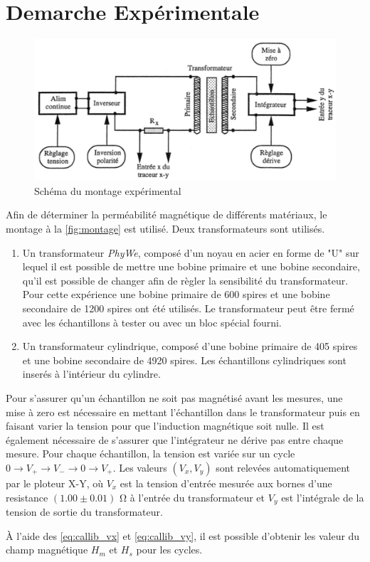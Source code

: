 \section{Demarche Expérimentale}

\begin{figure}[h]
    \centering
    \includegraphics[width=0.8\linewidth]{figures/montage.png}
    \caption{Schéma du montage expérimental \cite{notice}}
    \label{fig:montage}
\end{figure}

Afin de déterminer la perméabilité magnétique de différents matériaux, le montage à la \autoref{fig:montage} est utilisé. Deux transformateurs sont utilisés.

\begin{enumerate}
    \item Un transformateur \textit{PhyWe}, composé d'un noyau en acier en forme de "U" sur lequel il est possible de mettre une bobine primaire et une bobine secondaire, qu'il est possible de changer afin de règler la sensibilité du transformateur. Pour cette expérience une bobine primaire de 600 spires et une bobine secondaire de 1200 spires ont été utilisés. Le transformateur peut être fermé avec les échantillons à tester ou avec un bloc spécial fourni.
    \item Un transformateur cylindrique, composé d'une bobine primaire de 405 spires et une bobine secondaire de 4920 spires. Les échantillons cylindriques sont inserés à l'intérieur du cylindre.
\end{enumerate}

Pour s'assurer qu'un échantillon ne soit pas magnétisé avant les mesures, une mise à zero est nécessaire en mettant l'échantillon dans le transformateur puis en faisant varier la tension pour que l'induction magnétique soit nulle. Il est également nécessaire de s'assurer que l'intégrateur ne dérive pas entre chaque mesure. Pour chaque échantillon, la tension est variée sur un cycle \(0 \rightarrow V_+ \rightarrow V_- \rightarrow 0 \rightarrow V_+\). Les valeurs \((V_x, V_y)\) sont relevées automatiquement par le ploteur X-Y, où \(V_x\) est la tension d'entrée mesurée aux bornes d'une resistance \((1.00 \pm 0.01)\) \si{\ohm} à l'entrée du transformateur et \(V_y\) est l'intégrale de la tension de sortie du transformateur.

À l'aide des \autoref{eq:callib_vx} et \autoref{eq:callib_vy}, il est possible d'obtenir les valeur du champ magnétique \(H_m\) et \(H_s\) pour les cycles.
